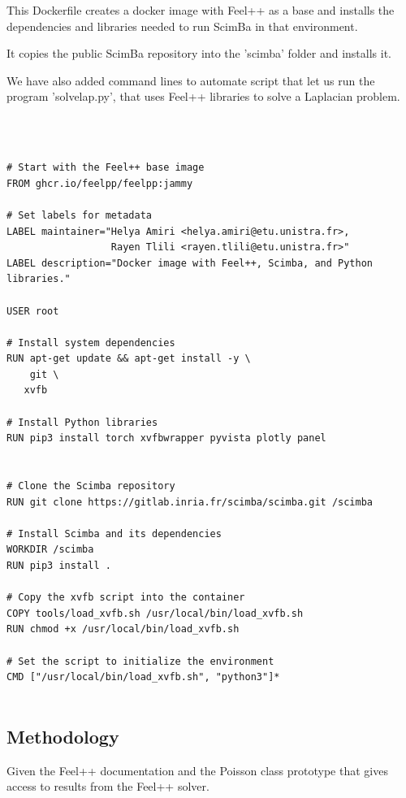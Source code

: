 \documentclass[12pt]{article}
\begin{document}
This Dockerfile creates a docker image with Feel++ as a base and installs the dependencies and libraries needed to run ScimBa in that environment.

It copies the public ScimBa repository into the 'scimba' folder and installs it.

We have also added command lines to automate script that let us run the program 'solvelap.py', that uses Feel++ libraries to solve a Laplacian problem.

\\

\begin{lstlisting}[language=docker,caption={Dockerfile for Feel++, Scimba, and Python libraries.},frame=single, backgroundcolor=\color{gray!10}, basicstyle=\footnotesize,rulecolor=\color{blue}, framexleftmargin=3pt, commentstyle=\color{mygreen}, keywordstyle=\color{blue}]

# Start with the Feel++ base image
FROM ghcr.io/feelpp/feelpp:jammy

# Set labels for metadata
LABEL maintainer="Helya Amiri <helya.amiri@etu.unistra.fr>, 
                  Rayen Tlili <rayen.tlili@etu.unistra.fr>"
LABEL description="Docker image with Feel++, Scimba, and Python libraries."

USER root

# Install system dependencies
RUN apt-get update && apt-get install -y \
    git \
   xvfb

# Install Python libraries
RUN pip3 install torch xvfbwrapper pyvista plotly panel


# Clone the Scimba repository
RUN git clone https://gitlab.inria.fr/scimba/scimba.git /scimba

# Install Scimba and its dependencies
WORKDIR /scimba
RUN pip3 install .

# Copy the xvfb script into the container
COPY tools/load_xvfb.sh /usr/local/bin/load_xvfb.sh
RUN chmod +x /usr/local/bin/load_xvfb.sh

# Set the script to initialize the environment
CMD ["/usr/local/bin/load_xvfb.sh", "python3"]*


\end{lstlisting}



\newpage
\subsection{Methodology}
Given the Feel++ documentation and the Poisson class prototype that gives access to results from the Feel++ solver.
\end{document}
